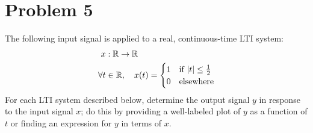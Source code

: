 \documentclass[10pt]{article}
\begin{document}
	\section*{Problem 5}
	The following input signal is applied to a real, continuous-time LTI system: 
	\begin{align*}
		x&: \mathbb R \to \mathbb R\\
		\forall t &\in \mathbb R, \ \ \ x(t) = \begin{cases}
			1 & \text{if \( |t| \le \frac{1}{2} \)}\\
			0 & \text{elsewhere}
		\end{cases}
	\end{align*}
	For each LTI system described below, determine the output signal \( y \) in response to the input 
	signal \( x \); do this by providing a well-labeled plot of \( y \) as a function of \( t \) or finding 
	an expression for \( y \) in terms of \( x \). 
\end{document}
